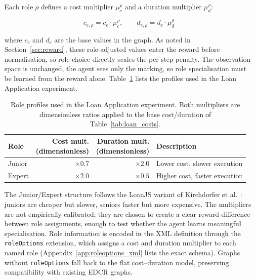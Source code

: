 Each role $\rho$ defines a cost multiplier $\mu^\rho_c$ and a
duration multiplier $\mu^\rho_d$:

\begin{equation}
c_{e,\rho} = c_e \cdot \mu^\rho_c, \qquad
d_{e,\rho} = d_e \cdot \mu^\rho_d
\end{equation}

where $c_e$ and $d_e$ are the base values in the graph. As noted in
Section~\ref{sec:reward}, these role-adjusted values enter the reward
before normalisation, so role choice directly scales the per-step
penalty. The observation space is unchanged, the agent sees only the
marking, so role specialisation must be learned from the reward
alone. Table~\ref{tab:role_multipliers} lists the profiles used in
the Loan Application experiment.

\begin{table}[H]
\centering
\caption{Role profiles used in the Loan Application experiment. Both
multipliers are dimensionless ratios applied to the base cost/duration
of Table~\ref{tab:loan_costs}.}
\label{tab:role_multipliers}
{\renewcommand{\arraystretch}{1.5}
\setlength{\tabcolsep}{14pt}
\begin{tabular}{lrrl}
\toprule
\textbf{Role} & \shortstack{\textbf{Cost mult.} \\ (dimensionless)} &
\shortstack{\textbf{Duration mult.} \\ (dimensionless)} & \textbf{Description} \\
\midrule
Junior & $\times 0.7$ & $\times 2.0$ &
    Lower cost, slower execution \\
Expert & $\times 2.0$ & $\times 0.5$ &
    Higher cost, faster execution \\
\bottomrule
\end{tabular}
}
\end{table}


The Junior/Expert structure follows the LoanJS variant of Kirchdorfer
et al.~\cite{KirchdorferLukasFromPolicies}: juniors are cheaper but
slower, seniors faster but more expensive. The multipliers are not
empirically calibrated; they are chosen to create a clear reward
difference between role assignments, enough to test whether the agent
learns meaningful specialisation. Role information is encoded in the
XML definition through the \texttt{roleOptions} extension, which
assigns a cost and duration multiplier to each named role
(Appendix~\ref{app:roleoptions_xml} lists the exact schema). Graphs
without \texttt{roleOptions} fall back to the flat
cost--duration model, preserving compatibility with existing
\ac{EDCR} graphs.


